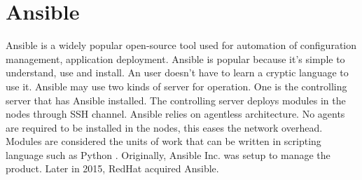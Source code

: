\section{Ansible}

Ansible is a widely popular open-source tool used for automation of configuration management,
application deployment. Ansible is popular because it’s simple to understand, use and install.
An user doesn’t have to learn a cryptic language to use it.
Ansible may use two kinds of server for operation. One is the controlling server that has Ansible installed.
The controlling server deploys modules in the nodes through SSH channel. Ansible relies on agentless architecture.
No agents are required to be installed in the nodes, this eases the network overhead.
Modules are considered the units of work that can be written in scripting language such as Python
\cite {hid-sp18-417-wiki-Ansible}.
Originally, Ansible Inc. was setup to manage the product. Later in 2015, RedHat acquired Ansible.
